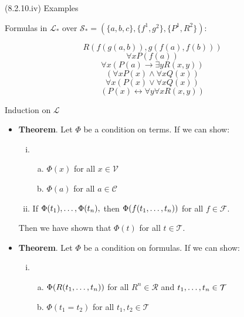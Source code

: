 \begin{frame}{(8.2.10.iv) Examples}

Formulas in $\mathcal{L_\ast}$ over $\mathcal{S_\ast}=(\{a,b,c\}, \{f^1, g^2\}, \{P^1, R^2\})$:
				
				\[R(f(g(a,b)),g(f(a),f(b)))\]
				\[\forall x P(f(a))\]
				\[\forall x(P(a)\to \exists yR(x,y))\]
				\[(\forall xP(x)\land \forall xQ(x))\]
				\[\forall x(P(x)\lor \forall xQ(x))\]
				\[(P(x)\leftrightarrow \forall y\forall xR(x,y))\]

\end{frame}

\begin{frame}{Induction on $\mathcal{L}$}

	\begin{itemize}%
	\itemsep=16pt


	\item \textbf{Theorem}.  Let $\Phi$ be a condition on terms. If we can show:
		\begin{enumerate}[(i)]
		
			\item  \begin{enumerate}[(a)]
			
				\item $\Phi(x)$ for all $x\in\mathcal{V}$

				\item $\Phi(a)$ for all $a\in\mathcal{C}$
							
			\end{enumerate}
			
			\item If $\Phi(t_1), \mathellipsis,\Phi(t_n),$ then $\Phi(f(t_1,\mathellipsis,t_n))$ for all $f\in\mathcal{F}$.
		\end{enumerate}
		Then we have shown that $\Phi(t)$ for all $t\in\mathcal{T}$.
	
		\item \textbf{Theorem}. Let $\Phi$ be a condition on formulas. If we can show:
		\begin{enumerate}[(i)]
		
			\item  \begin{enumerate}[(a)]
			
				\item $\Phi(R(t_1,\mathellipsis, t_n))$ for all $R^n\in \mathcal{R}$ and $t_1,\mathellipsis, t_n\in\mathcal{T}$
				
				\item $\Phi(t_1=t_2)$ for all $t_1,t_2\in \mathcal{T}$
			

\end{enumerate}
\end{enumerate}
\end{itemize}
\end{frame}
